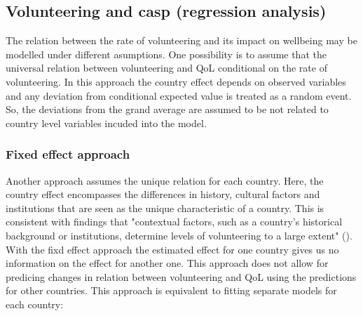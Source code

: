 \documentclass[10pt, letterpaper]{article}
\begin{document}
\begin{spacing}{1.4}

\subsection*{Volunteering and casp (regression analysis)}

The relation between the rate of volunteering and its impact on wellbeing may be modelled under different asumptions. One possibility is to assume that the universal relation between volunteering and QoL conditional on the rate of volunteering. In this approach the country effect depends on observed variables and any deviation from conditional expected value is treated as a random event. So, the deviations from the grand average are assumed to be not related to country level variables incuded into the model. 

\subsubsection*{ Fixed effect approach}

 Another approach assumes the unique relation for each country. Here, the country effect encompasses the differences in history, cultural factors and institutions that are seen as the unique characteristic of a country. This is consistent with findings that "contextual factors, such as a country’s historical background or institutions, determine levels of volunteering to a large extent" (\citet{plagnol10}). With the fixd effect approach the estimated effect for one country  gives us no information on the effect for another one. This approach does not allow for predicing changes in relation between volunteering and QoL using the predictions for other countries. This approach is equivalent to fitting separate models for each country: 


\end{spacing}
\end{document}

